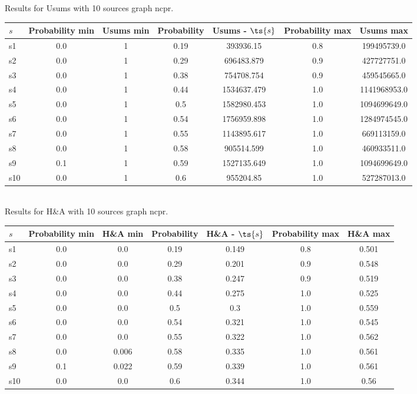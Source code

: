 \documentclass{article}
\begin{document}
\noindent Results for Usums with 10 sources graph ncpr.

\noindent\begin{tabular}{|l|c|c|c|c|c|c|}
\hline
$s$& Probability min & Usums min & Probability & Usums - $\ts{s}$ & Probability max & Usums max\\
\hline
s1 &0.0 & 1 & 0.19 & 393936.15 & 0.8 & 199495739.0\\
\hline
s2 &0.0 & 1 & 0.29 & 696483.879 & 0.9 & 427727751.0\\
\hline
s3 &0.0 & 1 & 0.38 & 754708.754 & 0.9 & 459545665.0\\
\hline
s4 &0.0 & 1 & 0.44 & 1534637.479 & 1.0 & 1141968953.0\\
\hline
s5 &0.0 & 1 & 0.5 & 1582980.453 & 1.0 & 1094699649.0\\
\hline
s6 &0.0 & 1 & 0.54 & 1756959.898 & 1.0 & 1284974545.0\\
\hline
s7 &0.0 & 1 & 0.55 & 1143895.617 & 1.0 & 669113159.0\\
\hline
s8 &0.0 & 1 & 0.58 & 905514.599 & 1.0 & 460933511.0\\
\hline
s9 &0.1 & 1 & 0.59 & 1527135.649 & 1.0 & 1094699649.0\\
\hline
s10 &0.0 & 1 & 0.6 & 955204.85 & 1.0 & 527287013.0\\
\hline
\end{tabular}\\

\noindent Results for H\&A with 10 sources graph ncpr.

\noindent\begin{tabular}{|l|c|c|c|c|c|c|}
\hline
$s$& Probability min & H\&A min & Probability & H\&A - $\ts{s}$ & Probability max & H\&A max\\
\hline
s1 &0.0 & 0.0 & 0.19 & 0.149 & 0.8 & 0.501\\
\hline
s2 &0.0 & 0.0 & 0.29 & 0.201 & 0.9 & 0.548\\
\hline
s3 &0.0 & 0.0 & 0.38 & 0.247 & 0.9 & 0.519\\
\hline
s4 &0.0 & 0.0 & 0.44 & 0.275 & 1.0 & 0.525\\
\hline
s5 &0.0 & 0.0 & 0.5 & 0.3 & 1.0 & 0.559\\
\hline
s6 &0.0 & 0.0 & 0.54 & 0.321 & 1.0 & 0.545\\
\hline
s7 &0.0 & 0.0 & 0.55 & 0.322 & 1.0 & 0.562\\
\hline
s8 &0.0 & 0.006 & 0.58 & 0.335 & 1.0 & 0.561\\
\hline
s9 &0.1 & 0.022 & 0.59 & 0.339 & 1.0 & 0.561\\
\hline
s10 &0.0 & 0.0 & 0.6 & 0.344 & 1.0 & 0.56\\
\hline
\end{tabular}\\
\end{document}
